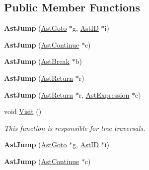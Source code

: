 \subsection*{Public Member Functions}
\begin{DoxyCompactItemize}
\item 
\hypertarget{classAstJump_a83a4aa905d84f3602374029976d99412}{{\bfseries Ast\-Jump} (\hyperlink{classAstGoto}{Ast\-Goto} $\ast$g, \hyperlink{classAstID}{Ast\-I\-D} $\ast$i)}\label{classAstJump_a83a4aa905d84f3602374029976d99412}

\item 
\hypertarget{classAstJump_a945a1bdc268bfa7f1fdd9f4d39bdef1a}{{\bfseries Ast\-Jump} (\hyperlink{classAstContinue}{Ast\-Continue} $\ast$c)}\label{classAstJump_a945a1bdc268bfa7f1fdd9f4d39bdef1a}

\item 
\hypertarget{classAstJump_a8b9e461b6a974f01889e89728afc7014}{{\bfseries Ast\-Jump} (\hyperlink{classAstBreak}{Ast\-Break} $\ast$b)}\label{classAstJump_a8b9e461b6a974f01889e89728afc7014}

\item 
\hypertarget{classAstJump_a083525b758ad6e931aee5ac850592730}{{\bfseries Ast\-Jump} (\hyperlink{classAstReturn}{Ast\-Return} $\ast$r)}\label{classAstJump_a083525b758ad6e931aee5ac850592730}

\item 
\hypertarget{classAstJump_ad80d35d23849aa369fef153fef4bb99e}{{\bfseries Ast\-Jump} (\hyperlink{classAstReturn}{Ast\-Return} $\ast$r, \hyperlink{classAstExpression}{Ast\-Expression} $\ast$e)}\label{classAstJump_ad80d35d23849aa369fef153fef4bb99e}

\item 
void \hyperlink{classAstJump_aca65cbe034ffdb439f6e3c73e40550ae}{Visit} ()
\begin{DoxyCompactList}\small\item\em This function is responsible for tree traversals. \end{DoxyCompactList}\item 
\hypertarget{classAstJump_a83a4aa905d84f3602374029976d99412}{{\bfseries Ast\-Jump} (\hyperlink{classAstGoto}{Ast\-Goto} $\ast$g, \hyperlink{classAstID}{Ast\-I\-D} $\ast$i)}\label{classAstJump_a83a4aa905d84f3602374029976d99412}

\item 
\hypertarget{classAstJump_a945a1bdc268bfa7f1fdd9f4d39bdef1a}{{\bfseries Ast\-Jump} (\hyperlink{classAstContinue}{Ast\-Continue} $\ast$c)}\label{classAstJump_a945a1bdc268bfa7f1fdd9f4d39bdef1a}


\end{DoxyCompactItemize}
